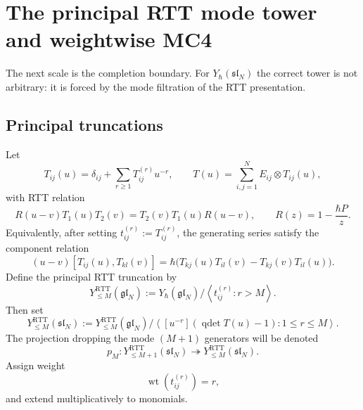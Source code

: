 \section{The principal RTT mode tower and weightwise MC4}
\label{sec:typeA-weightwise-mc4}

The next scale is the completion boundary. For
$Y_\hbar(\mathfrak{sl}_N)$ the correct tower is not arbitrary: it is
forced by the mode filtration of the RTT presentation.

\subsection{Principal truncations}

Let
\begin{equation}
T_{ij}(u)=\delta_{ij}+\sum_{r\ge 1}T^{(r)}_{ij}u^{-r},
\qquad
T(u)=\sum_{i,j=1}^{N}E_{ij}\otimes T_{ij}(u),
\end{equation}
with RTT relation
\begin{equation}
\label{eq:typeA-rtt-matrix-relation}
R(u-v)T_1(u)T_2(v)=T_2(v)T_1(u)R(u-v),
\qquad R(z)=1-\frac{\hbar P}{z}.
\end{equation}
Equivalently, after setting $t_{ij}^{(r)}:=T_{ij}^{(r)}$, the generating
series satisfy the component relation
\begin{equation}
\label{eq:typeA-rtt-component-relation}
(u-v)[T_{ij}(u),T_{kl}(v)]
=
\hbar\bigl(T_{kj}(u)T_{il}(v)-T_{kj}(v)T_{il}(u)\bigr).
\end{equation}
Define the principal RTT truncation by
\begin{equation}
Y^{\mathrm{RTT}}_{\le M}(\mathfrak{gl}_N)
:=
Y_\hbar(\mathfrak{gl}_N)\Big/\left\langle t^{(r)}_{ij}:r>M\right\rangle.
\end{equation}
Then set
\begin{equation}
Y^{\mathrm{RTT}}_{\le M}(\mathfrak{sl}_N)
:=
Y^{\mathrm{RTT}}_{\le M}(\mathfrak{gl}_N)
\Big/
\left\langle [u^{-r}](\operatorname{qdet}T(u)-1):1\le r\le M\right\rangle.
\end{equation}
The projection dropping the mode $(M+1)$ generators will be denoted
\begin{equation}
p_M:Y^{\mathrm{RTT}}_{\le M+1}(\mathfrak{sl}_N)\twoheadrightarrow
Y^{\mathrm{RTT}}_{\le M}(\mathfrak{sl}_N).
\end{equation}
Assign weight
\begin{equation}
\operatorname{wt}(t^{(r)}_{ij})=r,
\end{equation}
and extend multiplicatively to monomials.

